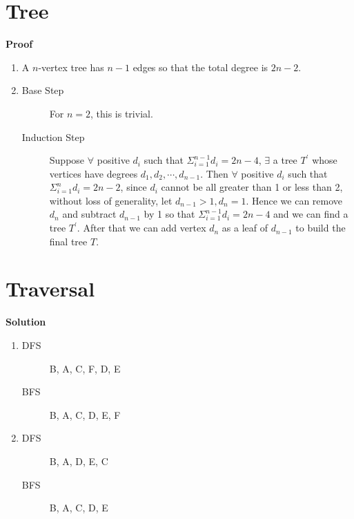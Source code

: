 \documentclass{../../cls/sig-alternate-05-2015}
\begin{document}
\section{Tree}
\textbf{Proof}\begin{enumerate}[label=(\alph*)]
	\item A $n$-vertex tree has $n-1$ edges so that the total degree is $2n - 2$.
	\item \begin{description}
		\item[Base Step] For $n = 2$, this is trivial.
		\item[Induction Step] Suppose $\forall$ positive $d_i$ such that $\Sigma_{i = 1}^{n - 1} d_i = 2n - 4$, $\exists$ a tree $T^\prime$ whose vertices have degrees $d_1, d_2, \cdots, d_{n - 1}$. Then $\forall$ positive $d_i$ such that $\Sigma_{i = 1}^{n} d_i = 2n - 2$, since $d_i$ cannot be all greater than 1 or less than 2, without loss of generality, let $d_{n - 1} > 1, d_n = 1$. Hence we can remove $d_n$ and subtract $d_{n - 1}$ by 1 so that $\Sigma_{i = 1}^{n - 1} d_i = 2n - 4$ and we can find a tree $T^\prime$. After that we can add vertex $d_n$ as a leaf of $d_{n - 1}$ to build the final tree $T$.
	\end{description}
\end{enumerate}

\section{Traversal}
\textbf{Solution}\begin{enumerate}[label=(\alph*)]
	\item \begin{description}
		\item[DFS] B, A, C, F, D, E
		\item[BFS] B, A, C, D, E, F
	\end{description}
	\item \begin{description}
		\item[DFS] B, A, D, E, C
		\item[BFS] B, A, C, D, E
	\end{description}
\end{enumerate}
\end{document}
